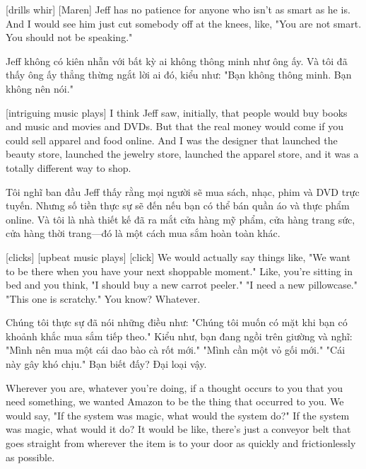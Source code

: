 \documentclass[a4paper]{article}
\begin{document}
	[drills whir]
	[Maren] Jeff has no patience for anyone who isn't as smart as he is.
	And I would see him just cut somebody off at the knees, like, "You are not smart. You should not be speaking."
	
	\begin{vietnamese-v2}
		 Jeff không có kiên nhẫn với bất kỳ ai không thông minh như ông ấy. 
		Và tôi đã thấy ông ấy thẳng thừng ngắt lời ai đó, kiểu như: "Bạn không thông minh. Bạn không nên nói."
	\end{vietnamese-v2}
	
	[intriguing music plays]
	I think Jeff saw, initially, that people would buy books and music and movies and DVDs.
	But that the real money would come if you could sell apparel and food online.
	And I was the designer that launched the beauty store, launched the jewelry store, launched the apparel store, and it was a totally different way to shop.
	
	\begin{vietnamese-v2}
		 Tôi nghĩ ban đầu Jeff thấy rằng mọi người sẽ mua sách, nhạc, phim và DVD trực tuyến. 
		Nhưng số tiền thực sự sẽ đến nếu bạn có thể bán quần áo và thực phẩm online. 
		Và tôi là nhà thiết kế đã ra mắt cửa hàng mỹ phẩm, cửa hàng trang sức, cửa hàng thời trang—đó là một cách mua sắm hoàn toàn khác.
	\end{vietnamese-v2}
	
	[clicks]
	[upbeat music plays]
	[click]
	We would actually say things like, "We want to be there when you have your next shoppable moment."
	Like, you're sitting in bed and you think, "I should buy a new carrot peeler."
	"I need a new pillowcase."
	"This one is scratchy." You know? Whatever.
	
	\begin{vietnamese-v2}
		Chúng tôi thực sự đã nói những điều như: "Chúng tôi muốn có mặt khi bạn có khoảnh khắc mua sắm tiếp theo." 
		Kiểu như, bạn đang ngồi trên giường và nghĩ: "Mình nên mua một cái dao bào cà rốt mới." 
		"Mình cần một vỏ gối mới." 
		"Cái này gây khó chịu." Bạn biết đấy? Đại loại vậy.
	\end{vietnamese-v2}
	
	Wherever you are, whatever you're doing, if a thought occurs to you that you need something, we wanted Amazon to be the thing that occurred to you.
	We would say, "If the system was magic, what would the system do?"
	If the system was magic, what would it do? It would be like, there's just a conveyor belt that goes straight from wherever the item is to your door as quickly and frictionlessly as possible.
	
\end{document}
